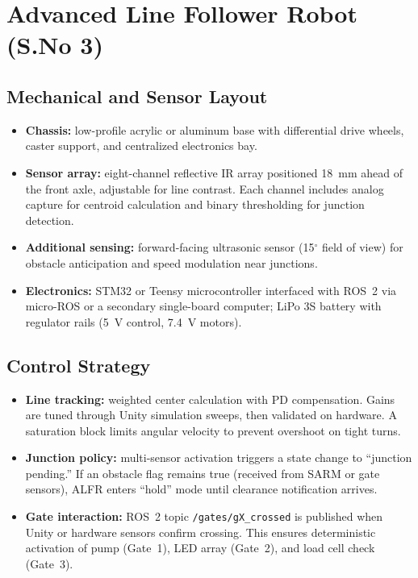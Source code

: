 \documentclass[12pt]{article}
\begin{document}
\section{Advanced Line Follower Robot (S.No 3)}\label{sec:alfr}
\subsection{Mechanical and Sensor Layout}
\begin{itemize}
    \item \textbf{Chassis:} low-profile acrylic or aluminum base with differential drive wheels, caster support, and centralized electronics bay.
    \item \textbf{Sensor array:} eight-channel reflective IR array positioned 18~mm ahead of the front axle, adjustable for line contrast. Each channel includes analog capture for centroid calculation and binary thresholding for junction detection.
    \item \textbf{Additional sensing:} forward-facing ultrasonic sensor (15$^{\circ}$ field of view) for obstacle anticipation and speed modulation near junctions.
    \item \textbf{Electronics:} STM32 or Teensy microcontroller interfaced with ROS~2 via micro-ROS or a secondary single-board computer; LiPo 3S battery with regulator rails (5~V control, 7.4~V motors).
\end{itemize}

\subsection{Control Strategy}
\begin{itemize}
    \item \textbf{Line tracking:} weighted center calculation with PD compensation. Gains are tuned through Unity simulation sweeps, then validated on hardware. A saturation block limits angular velocity to prevent overshoot on tight turns.
    \item \textbf{Junction policy:} multi-sensor activation triggers a state change to ``junction pending.'' If an obstacle flag remains true (received from SARM or gate sensors), ALFR enters ``hold'' mode until clearance notification arrives.
    \item \textbf{Gate interaction:} ROS~2 topic \texttt{/gates/gX\_crossed} is published when Unity or hardware sensors confirm crossing. This ensures deterministic activation of pump (Gate~1), LED array (Gate~2), and load cell check (Gate~3).
\end{itemize}
\end{document}
